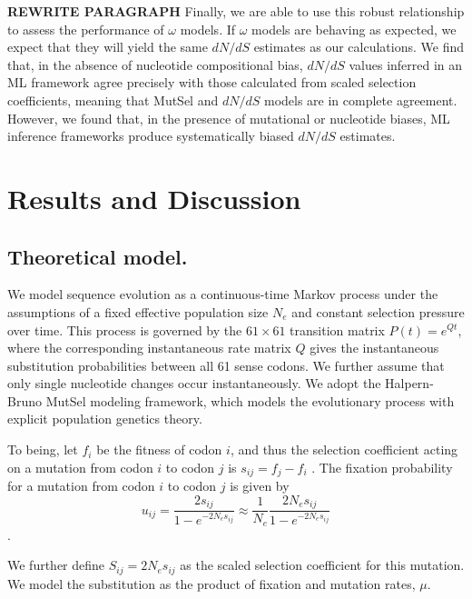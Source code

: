 \documentclass{pnastwo}
\begin{document}
\begin{article}
\textbf{REWRITE PARAGRAPH}
Finally, we are able to use this robust relationship to assess the performance of $\omega$ models. If $\omega$ models are behaving as expected, we expect that they will yield the same $dN/dS$ estimates as our calculations. We find that, in the absence of nucleotide compositional bias, $dN/dS$ values inferred in an ML framework agree precisely with those calculated from scaled selection coefficients, meaning that MutSel and $dN/dS$ models are in complete agreement. However, we found that, in the presence of mutational or nucleotide biases, ML inference frameworks produce systematically biased $dN/dS$ estimates. 
		
		
\section*{Results and Discussion}
		
		
\subsection*{Theoretical model.}

We model sequence evolution as a continuous-time Markov process \cite{Yang2006} under the assumptions of a fixed effective population size $N_e$ and constant selection pressure over time. This process is governed by the $61 \times 61$ transition matrix $P(t) = e^{Qt}$, where the corresponding instantaneous rate matrix $Q$ gives the instantaneous substitution probabilities between all 61 sense codons. We further assume that only single nucleotide changes occur instantaneously. We adopt the Halpern-Bruno \cite{HalpernBruno1998,YangNielsen2008,Tamurietal2012,Thorne2012} MutSel modeling framework, which models the evolutionary process with explicit population genetics theory. 

To being, let $f_i$ be the fitness of codon $i$, and thus the selection coefficient acting on a mutation from codon $i$ to codon $j$ is $s_{ij} = f_j - f_i$ \cite{SellaHirsh2005,YangNielsen2008}. The fixation probability for a mutation from codon $i$ to codon $j$ is given by 
\begin{equation}\label{eq:u_ij}
u_{ij} = \frac{2s_{ij}}{1 - e^{-2N_es_{ij}}} \approx \frac{1}{N_e}\frac{2N_es_{ij}}{1 - e^{-2N_es_{ij}}}
\end{equation} \cite{Kimura1962,HalpernBruno1998,YangNielsen2008}. 

We further define $S_{ij} = 2N_es_{ij}$ as the scaled selection coefficient for this mutation. We model the substitution as the product of fixation and mutation rates, $\mu$. 


\end{article}
\end{document}
